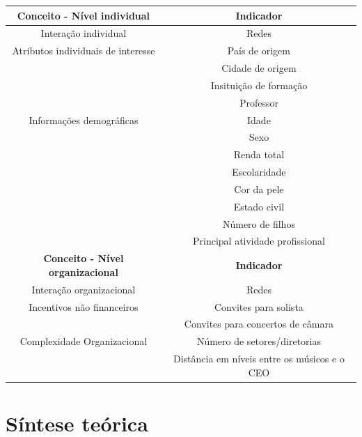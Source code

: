 \documentclass[a4paper, 12pt, openright, oneside, german, french, english, brazil]{abntex2}
\begin{document}
	
	\begin{table}
		{\begin{tabular}{|c|c|}
				
				\hline
				\textbf{Conceito - Nível individual} & \textbf{Indicador} \\
				\hline
				Interação individual & Redes \\
				\hline
				Atributos individuais de interesse & País de origem  \\
				& Cidade de origem  \\
				& Insituição de formação \\
				& Professor    \\
				\hline
				Informações demográficas & Idade \\
				& Sexo \\
				& Renda total \\
				& Escolaridade \\
				& Cor da pele \\
				& Estado civil \\
				& Número de filhos \\
				& Principal atividade profissional \\
				\hline
				\textbf{Conceito - Nível organizacional} & \textbf{Indicador} \\
				\hline
				Interação organizacional & Redes \\
				\hline
				Incentivos não financeiros & Convites para solista \\
				& Convites para concertos de câmara \\
				\hline
				Complexidade Organizacional  & Número de setores/diretorias  \\
				& Distância em níveis entre os músicos e o CEO \\
				\hline
				
			\end{tabular}
		}
		{}
	\end{table}
	
	



	\section{Síntese teórica}
\end{document}
